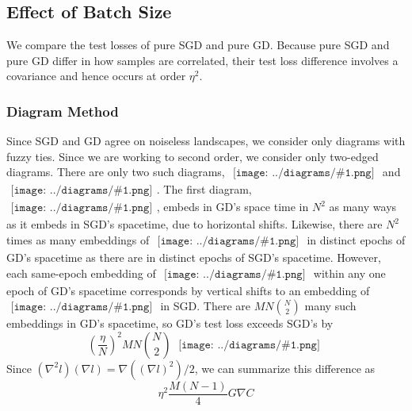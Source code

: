 \documentclass{article}
\newcommand{\wrap}[1]{\left(#1\right)}
\newcommand{\sdia}[1]{\begin{gathered}\texttt{[image: ../diagrams/\#1.png]}\end{gathered}}
\begin{document}
    \subsection{Effect of Batch Size}
        We compare the test losses of pure SGD and pure GD.  Because pure
        SGD and pure GD differ in how samples are correlated, their test loss
        difference involves a covariance and hence occurs at order $\eta^2$.  

        \subsubsection*{Diagram Method}
            Since SGD and GD agree on noiseless landscapes, we consider only
            diagrams with fuzzy ties.  Since we are working to second order, we
            consider only two-edged diagrams.  There are only two such
            diagrams, $\sdia{(01-2)(02-12)}$ and $\sdia{(01-2)(01-12)}$.  The
            first diagram, $\sdia{(01-2)(02-12)}$, embeds in GD's space time in
            $N^2$ as many ways as it embeds in SGD's spacetime, due to
            horizontal shifts.  Likewise, there are $N^2$ times as many
            embeddings of $\sdia{(01-2)(02-12)}$ in distinct epochs of GD's
            spacetime as there are in distinct epochs of SGD's spacetime.
            However, each same-epoch embedding of $\sdia{(01-2)(01-12)}$ within
            any one epoch of GD's spacetime corresponds by vertical shifts to
            an embedding of $\sdia{(0-1-2)(01-12)}$ in SGD.  There are
            $MN{N\choose 2}$ many such embeddings in GD's spacetime, so GD's
            test loss exceeds SGD's by 
            $$
                \wrap{\frac{\eta}{N}}^2 MN{N\choose 2}~
                \sdia{c(01-2)(01-12)}
            $$
            Since $(\nabla^2 l) (\nabla l) = \nabla((\nabla l)^2)/2$, we can 
            summarize this difference as
            $$
                \eta^2 \frac{M(N-1)}{4} G \nabla C 
            $$
\end{document}

